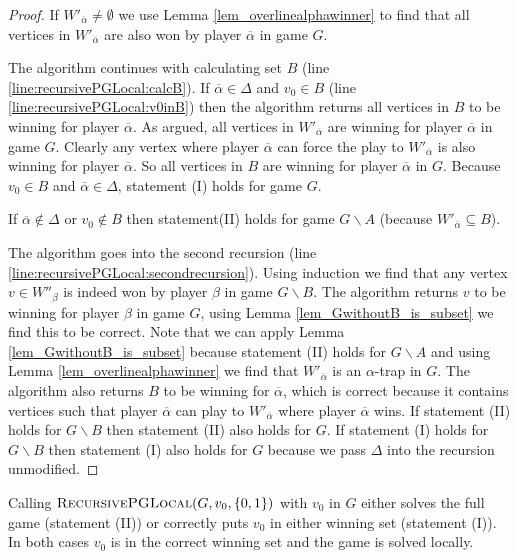 \begin{theorem}
\begin{proof}
			If $W'_{\overline{\alpha}} \neq \emptyset$ we use Lemma \ref{lem_overlinealphawinner} to find that all vertices in $W'_{\overline{\alpha}}$ are also won by player $\overline{\alpha}$ in game $G$.
			
			The algorithm continues with calculating set $B$ (line \ref{line:recursivePGLocal:calcB}). If $\overline{\alpha} \in \Delta$ and $v_0 \in B$ (line \ref{line:recursivePGLocal:v0inB}) then the algorithm returns all vertices in $B$ to be winning for player $\overline{\alpha}$. As argued, all vertices in $W'_{\overline{\alpha}}$ are winning for player $\overline{\alpha}$ in game $G$. Clearly any vertex where player $\overline{\alpha}$ can force the play to $W'_{\overline{\alpha}}$ is also winning for player $\overline{\alpha}$. So all vertices in $B$ are winning for player $\overline{\alpha}$ in $G$. Because $v_0 \in B$ and $\overline{\alpha} \in \Delta$, statement (I) holds for game $G$.
			
			If $\overline{\alpha} \notin \Delta$ or $v_0 \notin B$ then statement(II) holds for game $G\backslash A$ (because $W'_{\overline{\alpha}} \subseteq B$).
			
			The algorithm goes into the second recursion (line \ref{line:recursivePGLocal:secondrecursion}). Using induction we find that any vertex $v \in W''_\beta$ is indeed won by player $\beta$ in game $G\backslash B$. The algorithm returns $v$ to be winning for player $\beta$ in game $G$, using Lemma \ref{lem_GwithoutB_is_subset} we find this to be correct. Note that we can apply Lemma \ref{lem_GwithoutB_is_subset} because statement (II) holds for $G\backslash A$ and using Lemma \ref{lem_overlinealphawinner} we find that $W'_{\overline{\alpha}}$ is an $\alpha$-trap in $G$. The algorithm also returns $B$ to be winning for $\overline{\alpha}$, which is correct because it contains vertices such that player $\overline{\alpha}$ can play to $W'_{\overline{\alpha}}$ where player $\overline{\alpha}$ wins. If statement (II) holds for $G\backslash B$ then statement (II) also holds for $G$. If statement (I) holds for $G\backslash B$ then statement (I) also holds for $G$ because we pass $\Delta$ into the recursion unmodified.
		\end{proof}
\end{theorem}
Calling $\textsc{RecursivePGLocal}(G, v_0, \{0,1\})$ with $v_0$ in $G$ either solves the full game (statement (II)) or correctly puts $v_0$ in either winning set (statement (I)). In both cases $v_0$ is in the correct winning set and the game is solved locally.

